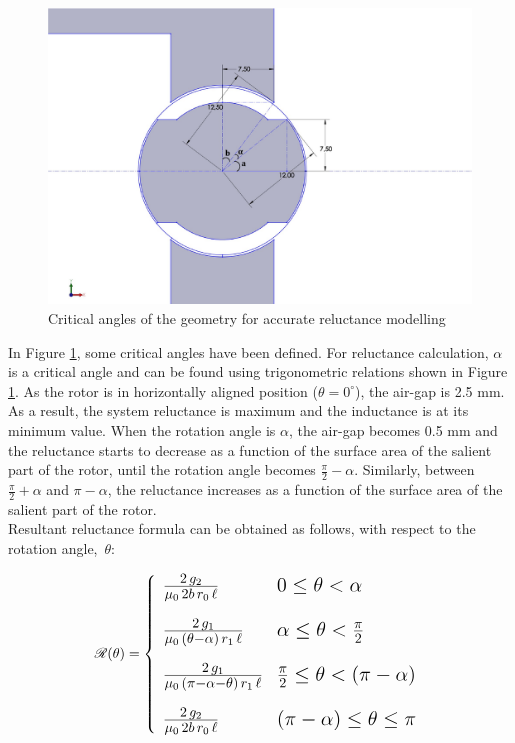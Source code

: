 \documentclass{reportClass}
\begin{document}
\begin{figure}[h!]
\centering
\includegraphics[trim = 40 40 140 60, clip, width=0.6\linewidth]{angles.eps}
\caption{Critical angles of the geometry for accurate reluctance modelling}
\label{fig:angles}
\end{figure}

In Figure \ref{fig:angles}, some critical angles have been defined. For reluctance calculation, $\alpha$ is a critical angle and can be found using trigonometric relations shown in Figure \ref{fig:angles}. As the rotor is in horizontally aligned position ($\theta = 0^\circ$), the air-gap is 2.5 mm. As a result, the system reluctance is maximum and the inductance is at its minimum value. When the rotation angle is $\alpha$, the air-gap becomes 0.5 mm and the reluctance starts to decrease as a function of the surface area of the salient part of the rotor, until the rotation angle becomes $\frac{\pi}{2} - \alpha$. Similarly, between $\frac{\pi}{2} + \alpha$ and $\pi - \alpha$, the reluctance increases as a function of the surface area of the salient part of the rotor.\\

Resultant reluctance formula can be obtained as follows, with respect to the rotation angle,~$\theta$:


$$
\mathcal{R}(\theta) = \left\{
		{\Large
        \begin{array}{ll}
            \frac{2\,g_2}{\mu_0\,2b\,r_0\,\ell} & 0 \leq \theta < \alpha \\ [1em]
            \frac{2\,g_1}{\mu_0\,(\theta - \alpha)\,r_1\,\ell} & \alpha \leq \theta < \frac{\pi}{2} \\ [1em]
            \frac{2\,g_1}{\mu_0\,(\pi - \alpha - \theta)\,r_1\,\ell} & \frac{\pi}{2} \leq \theta < (\pi - \alpha) \\ [1em]
            \frac{2\,g_2}{\mu_0\,2b\,r_0\,\ell} & (\pi - \alpha) \leq \theta \leq \pi
        \end{array} }
    \right.
$$
\end{document}
